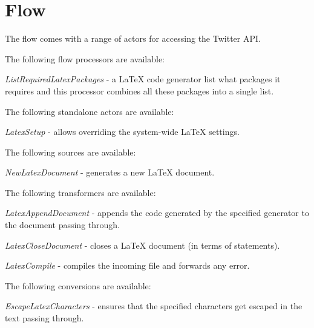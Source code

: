 \documentclass[a4paper]{book}
\begin{document}
\chapter{Flow}
The flow comes with a range of actors for accessing the Twitter API.

\noindent The following flow processors are available:
\begin{tight_itemize}
	\item \textit{ListRequiredLatexPackages} - a LaTeX code generator
	list what packages it requires and this processor combines all these
	packages into a single list.
\end{tight_itemize}

\noindent The following standalone actors are available:
\begin{tight_itemize}
	\item \textit{LatexSetup} - allows overriding the system-wide
	LaTeX settings.
\end{tight_itemize}

\noindent The following sources are available:
\begin{tight_itemize}
	\item \textit{NewLatexDocument} - generates a new LaTeX document.
\end{tight_itemize}

\noindent The following transformers are available:
\begin{tight_itemize}
	\item \textit{LatexAppendDocument} - appends the code generated by the
	specified generator to the document passing through.
	\item \textit{LatexCloseDocument} - closes a LaTeX document (in terms of statements).
	\item \textit{LatexCompile} - compiles the incoming file and forwards any error.
\end{tight_itemize}

\noindent The following conversions are available:
\begin{tight_itemize}
	\item \textit{EscapeLatexCharacters} - ensures that the specified
	characters get escaped in the text passing through.
\end{tight_itemize}

\end{document}
